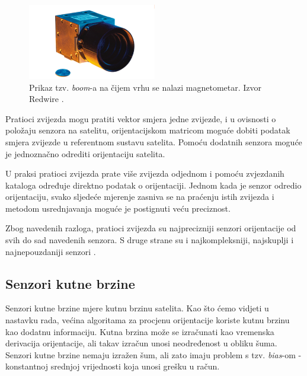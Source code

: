 \documentclass[times, utf8, diplomski, numeric]{templates/template}
\begin{document}
{{{{                \begin{figure}[htb]
                \centering
                \includegraphics[width=0.5\textwidth]{images/star_tracker.png}
                \caption{Prikaz tzv. \emph{boom}-a na čijem vrhu se nalazi magnetometar. Izvor Redwire \cite{starTrackerCite}.}
                \label{fig:star_tracker}
                \end{figure}

                Pratioci zvijezda mogu pratiti vektor smjera jedne zvijezde, i u ovisnosti o položaju senzora na satelitu, orijentacijskom matricom moguće dobiti podatak smjera zvijezde u referentnom sustavu satelita. Pomoću dodatnih senzora moguće je jednoznačno odrediti orijentaciju satelita. 

                U praksi pratioci zvijezda prate više zvijezda odjednom i pomoću zvjezdanih kataloga \cite{starCatalogs} određuje direktno podatak o orijentaciji. Jednom kada je senzor odredio orijentaciju, svako sljedeće mjerenje zasniva se na praćenju istih zvijezda i metodom usrednjavanja moguće je postignuti veću preciznost. 

                Zbog navedenih razloga, pratioci zvijezda su najprecizniji senzori orijentacije od svih do sad navedenih senzora. S druge strane su i najkompleksniji, najskuplji i najnepouzdaniji senzori \cite{adcsKnjiga}. 
            }
        }

        \subsection{Senzori kutne brzine}{
        \label{subsection:senzori_kutne_brzine}
            Senzori kutne brzine mjere kutnu brzinu satelita. Kao što ćemo vidjeti u nastavku rada, većina algoritama za procjenu orijentacije koriste kutnu brzinu kao dodatnu informaciju. Kutna brzina može se izračunati kao vremenska derivacija orijentacije, ali takav izračun unosi neodređenost u obliku šuma. Senzori kutne brzine nemaju izražen šum, ali zato imaju problem s tzv. \emph{bias}-om - konstantnoj srednjoj vrijednosti koja unosi grešku u račun. 

}}}
\end{document}
